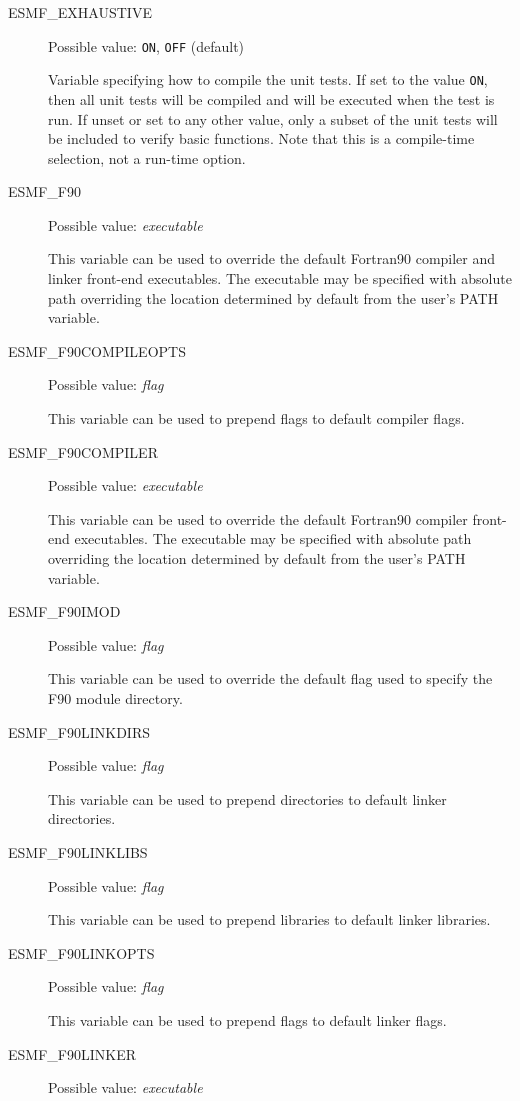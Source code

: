 \begin{description}
\item[ESMF\_EXHAUSTIVE] 
Possible value: {\tt ON}, {\tt OFF} (default)

Variable specifying how to compile the unit tests. If set to the value {\tt ON},
then all unit tests will be compiled and will be executed when the test is
run.  If unset or set to any other value, only a subset of the unit tests
will be included to verify basic functions. Note that this is a compile-time
selection, not a run-time option.

\item[ESMF\_F90]
Possible value: {\em executable}

This variable can be used to override the default Fortran90 compiler and linker
front-end executables. The executable may be specified with absolute path
overriding the location determined by default from the user's PATH variable.

\item[ESMF\_F90COMPILEOPTS]
Possible value: {\em flag}

This variable can be used to prepend flags to default compiler flags.

\item[ESMF\_F90COMPILER]
Possible value: {\em executable}

This variable can be used to override the default Fortran90 compiler
front-end executables. The executable may be specified with absolute path
overriding the location determined by default from the user's PATH variable.

\item[ESMF\_F90IMOD]
Possible value: {\em flag}

This variable can be used to override the default flag used to specify the F90
module directory.

\item[ESMF\_F90LINKDIRS]
Possible value: {\em flag}

This variable can be used to prepend directories to default linker directories.

\item[ESMF\_F90LINKLIBS]
Possible value: {\em flag}

This variable can be used to prepend libraries to default linker libraries.

\item[ESMF\_F90LINKOPTS]
Possible value: {\em flag}

This variable can be used to prepend flags to default linker flags.

\item[ESMF\_F90LINKER]
Possible value: {\em executable}


\end{description}
